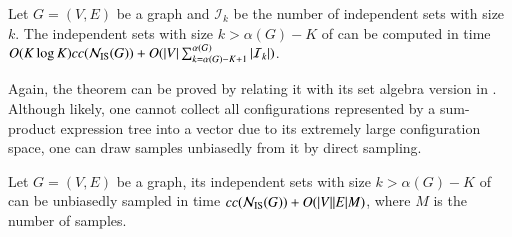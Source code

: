 \documentclass[review, onefignum, onetabnum]{siamart190516}
\begin{document}
\begin{corollary}\label{thm:complexexprk}
        Let $G = (V, E)$ be a graph and $\mathcal{I}_k$ be the number of independent sets with size $k$. The independent sets with size $k > \alpha(G)-K$ of can be computed in time $O(K\log K)cc({\mathcal{N}_{\rm IS}(G)}) + O(|V|\sum_{k=\alpha(G)-K+1}^{\alpha(G)}|\mathcal{I}_k|)$.
\end{corollary}
Again, the theorem can be proved by relating it with its set algebra version in . Although likely, one cannot collect all configurations represented by a sum-product expression tree into a vector due to its extremely large configuration space,
one can draw samples unbiasedly from it by direct sampling.
\begin{theorem}
    Let $G = (V, E)$ be a graph, its independent sets with size $k > \alpha(G)-K$ of can be unbiasedly sampled in time $cc({\mathcal{N}_{\rm IS}(G)}) + O(|V||E| M)$, where $M$ is the number of samples.
\end{theorem}
\end{document}
